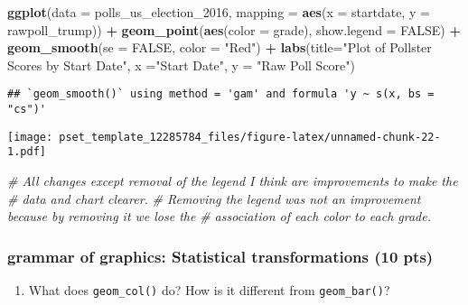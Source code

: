 \documentclass[
]{article}
\newenvironment{Shaded}{\begin{snugshade}}{\end{snugshade}}
\newcommand{\CommentTok}[1]{\textcolor[rgb]{0.56,0.35,0.01}{\textit{#1}}}
\newcommand{\DataTypeTok}[1]{\textcolor[rgb]{0.13,0.29,0.53}{#1}}
\newcommand{\DecValTok}[1]{\textcolor[rgb]{0.00,0.00,0.81}{#1}}
\newcommand{\KeywordTok}[1]{\textcolor[rgb]{0.13,0.29,0.53}{\textbf{#1}}}
\newcommand{\NormalTok}[1]{#1}
\newcommand{\OperatorTok}[1]{\textcolor[rgb]{0.81,0.36,0.00}{\textbf{#1}}}
\newcommand{\OtherTok}[1]{\textcolor[rgb]{0.56,0.35,0.01}{#1}}
\newcommand{\StringTok}[1]{\textcolor[rgb]{0.31,0.60,0.02}{#1}}
\providecommand{\tightlist}{%
  \setlength{\itemsep}{0pt}\setlength{\parskip}{0pt}}
\begin{document}
\begin{Shaded}
\begin{Highlighting}[]
    \KeywordTok{ggplot}\NormalTok{(}\DataTypeTok{data =}\NormalTok{ polls_us_election_}\DecValTok{2016}\NormalTok{, }
           \DataTypeTok{mapping =} \KeywordTok{aes}\NormalTok{(}\DataTypeTok{x =}\NormalTok{ startdate, }
                         \DataTypeTok{y =}\NormalTok{ rawpoll_trump)) }\OperatorTok{+}
\StringTok{        }\KeywordTok{geom_point}\NormalTok{(}\KeywordTok{aes}\NormalTok{(}\DataTypeTok{color =}\NormalTok{ grade), }\DataTypeTok{show.legend =} \OtherTok{FALSE}\NormalTok{) }\OperatorTok{+}
\StringTok{        }\KeywordTok{geom_smooth}\NormalTok{(}\DataTypeTok{se =} \OtherTok{FALSE}\NormalTok{, }\DataTypeTok{color =} \StringTok{"Red"}\NormalTok{) }\OperatorTok{+}\StringTok{ }\KeywordTok{labs}\NormalTok{(}\DataTypeTok{title=}\StringTok{"Plot of Pollster }
\StringTok{                                                      Scores by Start Date"}\NormalTok{,}
        \DataTypeTok{x =}\StringTok{"Start Date"}\NormalTok{, }\DataTypeTok{y =} \StringTok{"Raw Poll Score"}\NormalTok{)}
\end{Highlighting}
\end{Shaded}

\begin{verbatim}
## `geom_smooth()` using method = 'gam' and formula 'y ~ s(x, bs = "cs")'
\end{verbatim}

\texttt{[image: pset\_template\_12285784\_files/figure-latex/unnamed-chunk-22-1.pdf]}

\begin{Shaded}
\begin{Highlighting}[]
\CommentTok{# All changes except removal of the legend I think are improvements to make the }
\CommentTok{# data and chart clearer.}
\CommentTok{# Removing the legend was not an improvement because by removing it we lose the }
\CommentTok{# association of each color to each grade.}
\end{Highlighting}
\end{Shaded}

\hypertarget{grammar-of-graphics-statistical-transformations-10-pts}{%
\subsubsection{grammar of graphics: Statistical transformations (10
pts)}\label{grammar-of-graphics-statistical-transformations-10-pts}}

\begin{enumerate}
\def\labelenumi{\arabic{enumi}.}
\tightlist
\item
  What does \texttt{geom\_col()} do? How is it different from
  \texttt{geom\_bar()}?
\end{enumerate}
\end{document}
